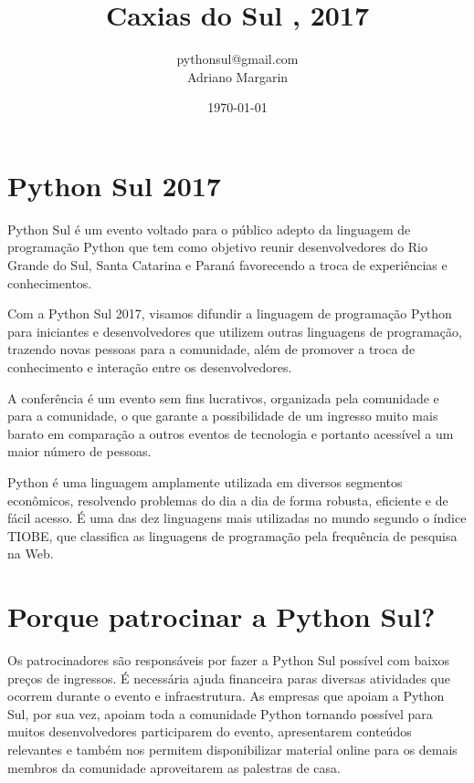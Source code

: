 \documentclass[12pt]{article}
\title{Caxias do Sul , 2017}
\author{pythonsul@gmail.com \\ Adriano Margarin}
\date{\today}
\begin{document}
\maketitle


\section{Python Sul 2017}

Python Sul é um evento voltado para o público adepto da linguagem de programação Python que tem como objetivo reunir desenvolvedores do Rio Grande do Sul, Santa Catarina e Paraná favorecendo a troca de experiências e conhecimentos.

Com a Python Sul 2017, visamos difundir a linguagem de programação Python para iniciantes e desenvolvedores que utilizem outras linguagens de programação, trazendo novas pessoas para a comunidade, além de promover a troca de conhecimento e interação entre os desenvolvedores.

A conferência é um evento sem fins lucrativos, organizada pela comunidade e para a comunidade, o que garante a possibilidade de um ingresso muito mais barato em comparação a outros eventos de tecnologia e portanto acessível a um maior número de pessoas.

Python é uma linguagem amplamente utilizada em diversos segmentos econômicos, resolvendo problemas do dia a dia de forma robusta, eficiente e de fácil acesso. É uma das dez linguagens mais utilizadas no mundo segundo o índice TIOBE, que classifica as linguagens de programação pela frequência de pesquisa na Web.

\section{Porque patrocinar a Python Sul?}

Os patrocinadores são responsáveis por fazer a Python Sul possível com baixos preços de ingressos. É necessária ajuda financeira paras diversas atividades que ocorrem durante o evento e infraestrutura. As empresas que apoiam a Python Sul, por sua vez, apoiam toda a comunidade Python tornando possível para muitos desenvolvedores participarem do evento, apresentarem conteúdos relevantes e também nos permitem disponibilizar material online para os demais membros da comunidade aproveitarem as palestras de casa.
\end{document}
